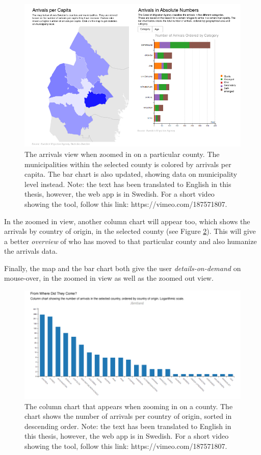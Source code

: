 \documentclass{acmtog} %
\begin{document}
\begin{figure}
\centering
\includegraphics[width=\textwidth]{img/view1_zoom_en.png}
\caption{The arrivals view when zoomed in on a particular county. The municipalities within the selected county is colored by arrivals per capita. The bar chart is also updated, showing data on municipality level instead. Note: the text has been translated to English in this thesis, however, the web app is in Swedish. For a short video showing the tool, follow this link: https://vimeo.com/187571807.}
\label{fig:view1_zoom}
\end{figure}

In the zoomed in view, another column chart will appear too, which shows the arrivals by country of origin, in the selected county (see Figure \ref{fig:view1_citizenship}). This will give a better \emph{overview} of who has moved to that particular county and also humanize the arrivals data.

Finally, the map and the bar chart both give the user \emph{details-on-demand} on mouse-over, in the zoomed in view as well as the zoomed out view.

\begin{figure}
\centering
\includegraphics[width=\textwidth]{img/view1_citizenship_en.png}
\caption{The column chart that appears when zooming in on a county. The chart shows the number of arrivals per country of origin, sorted in descending order. Note: the text has been translated to English in this thesis, however, the web app is in Swedish. For a short video showing the tool, follow this link: https://vimeo.com/187571807.}
\label{fig:view1_citizenship}
\end{figure}
\end{document}
